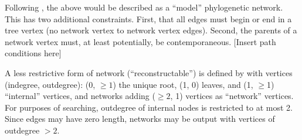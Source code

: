 \documentclass[12pt]{article}
\begin{document}
Following \cite{moretetal2004}, the above would be described as a ``model'' phylogenetic network.
This has two additional constraints.
First, that all edges must begin or end in a tree vertex (no network vertex to network vertex edges).  
Second,  the parents of a network vertex must, at least potentially, be contemporaneous. 
[Insert path conditions here]  
 
A less restrictive form of network (``reconstructable'') is defined by \cite{moretetal2004} with vertices (indegree, outdegree): 
(0, $\ge 1$) the unique root, (1, 0) leaves, and (1, $\ge$1) ``internal'' vertices, and networks adding ($\ge 2$, 1) vertices as ``network'' vertices.  For purposes of searching, outdegree of internal nodes is restricted to at most 2. Since edges may have zero length, networks may be output with vertices of outdegree $> 2$.
\end{document}
